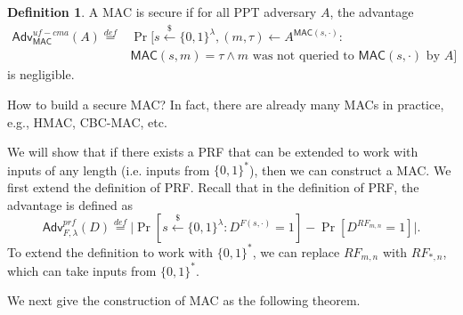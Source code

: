 \documentclass[12pt]{article}
\newcommand{\eqdef}{\stackrel{def}{=}}
\newcommand{\bits}{\{0,1\}}
\newcommand{\getsr}{\stackrel{\$}{\gets}}
\newcommand{\Adv}{\mathsf{Adv}}
\newcommand{\MAC}{\mathsf{MAC}}
\theoremstyle{definition}
\newtheorem{definition}[theorem]{Definition}
\begin{document}
\begin{definition}
A MAC is secure if for all PPT adversary $A$, the advantage
$$\begin{aligned}
\Adv_{\MAC}^{uf-cma}(A) \eqdef & \Pr[s \getsr \bits^\lambda, (m, \tau) \gets A^{\MAC(s,\cdot)} : \\
& \MAC(s,m)=\tau \wedge \textrm{$m$ was not queried to $\MAC(s,\cdot)$ by $A$}]
\end{aligned}$$
is negligible.
\end{definition}

How to build a secure MAC? In fact, there are already many MACs in practice, e.g., HMAC, CBC-MAC, etc.

We will show that if there exists a PRF that can be extended to work with inputs of any length (i.e. inputs from $\bits^*$), then we can construct a MAC. We first extend the definition of PRF. Recall that in the definition of PRF, the advantage is defined as
$$\Adv_{F,\lambda}^{prf}(D) \eqdef \bigg| \Pr[s \getsr \bits^\lambda: D^{F(s,\cdot)}=1] - \Pr[D^{RF_{m,n}}=1] \bigg|.$$
To extend the definition to work with $\bits^*$, we can replace $RF_{m,n}$ with $RF_{*,n}$, which can take inputs from $\bits^*$.

We next give the construction of MAC as the following theorem.
\end{document}
